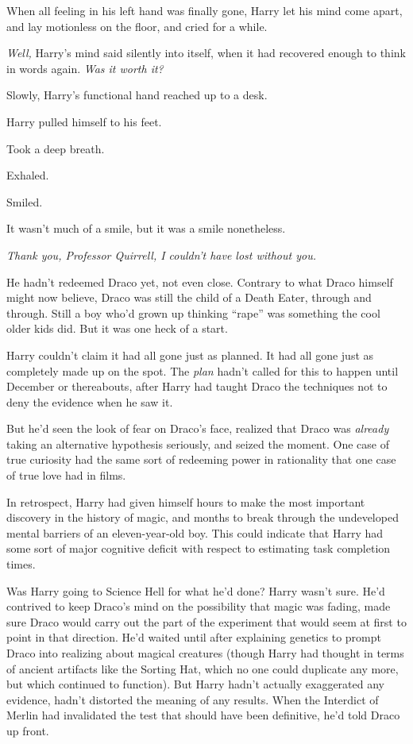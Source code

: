 When all feeling in his left hand was finally gone, Harry let his mind come
apart, and lay motionless on the floor, and cried for a while.

\emph{Well,} Harry’s mind said silently into itself, when it had recovered
enough to think in words again. \emph{Was it worth it?}

Slowly, Harry’s functional hand reached up to a desk.

Harry pulled himself to his feet.

Took a deep breath.

Exhaled.

Smiled.

It wasn’t much of a smile, but it was a smile nonetheless.

\emph{Thank you, Professor Quirrell, I couldn’t have lost without you.}

He hadn’t redeemed Draco yet, not even close. Contrary to what Draco himself
might now believe, Draco was still the child of a Death Eater, through and
through. Still a boy who’d grown up thinking “rape” was something the cool
older kids did. But it was one heck of a start.

Harry couldn’t claim it had all gone just as planned. It had all gone just as
completely made up on the spot. The \emph{plan} hadn’t called for this to
happen until December or thereabouts, after Harry had taught Draco the
techniques not to deny the evidence when he saw it.

But he’d seen the look of fear on Draco’s face, realized that Draco was
\emph{already} taking an alternative hypothesis seriously, and seized the
moment. One case of true curiosity had the same sort of redeeming power in
rationality that one case of true love had in films.

In retrospect, Harry had given himself hours to make the most important
discovery in the history of magic, and months to break through the undeveloped
mental barriers of an eleven-year-old boy. This could indicate that Harry had
some sort of major cognitive deficit with respect to estimating task completion
times.

Was Harry going to Science Hell for what he’d done? Harry wasn’t sure. He’d
contrived to keep Draco’s mind on the possibility that magic was fading, made
sure Draco would carry out the part of the experiment that would seem at first
to point in that direction. He’d waited until after explaining genetics to
prompt Draco into realizing about magical creatures (though Harry had thought
in terms of ancient artifacts like the Sorting Hat, which no one could
duplicate any more, but which continued to function). But Harry hadn’t actually
exaggerated any evidence, hadn’t distorted the meaning of any results. When the
Interdict of Merlin had invalidated the test that should have been definitive,
he’d told Draco up front.

